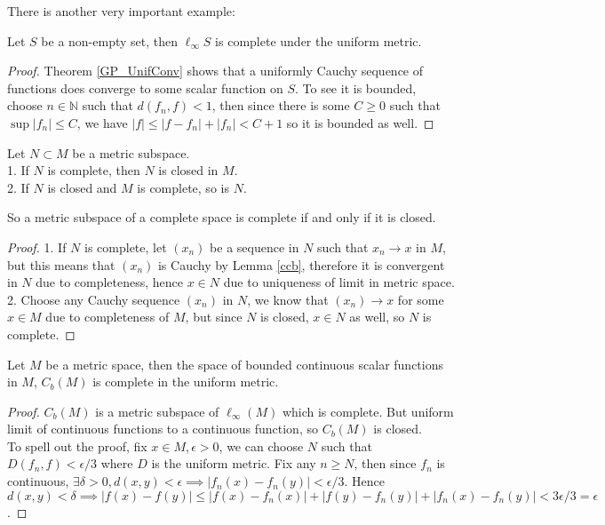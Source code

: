 There is another very important example:
\begin{theorem}
    Let $S$ be a non-empty set, then $\ell_\infty S$ is complete under the uniform metric.
\end{theorem}
\begin{proof}
    Theorem \ref{GP_UnifConv} shows that a uniformly Cauchy sequence of functions does converge to some scalar function on $S$.
    To see it is bounded, choose $n\in\mathbb N$ such that $d(f_n,f)<1$, then since there is some $C\ge 0$ such that $\sup|f_n|\le C$, we have $|f|\le |f-f_n|+|f_n|<C+1$ so it is bounded as well.
\end{proof}
\begin{proposition}
    Let $N\subset M$ be a metric subspace.\\
    1. If $N$ is complete, then $N$ is closed in $M$.\\
    2. If $N$ is closed and $M$ is complete, so is $N$.
\end{proposition}
So a metric subspace of a complete space is complete if and only if it is closed.
\begin{proof}
    1. If $N$ is complete, let $(x_n)$ be a sequence in $N$ such that $x_n\to x$ in $M$, but this means that $(x_n)$ is Cauchy by Lemma \ref{ccb}, therefore it is convergent in $N$ due to completeness, hence $x\in N$ due to uniqueness of limit in metric space.\\
    2. Choose any Cauchy sequence $(x_n)$ in $N$, we know that $(x_n)\to x$ for some $x\in M$ due to completeness of $M$, but since $N$ is closed, $x\in N$ as well, so $N$ is complete.
\end{proof}
\begin{theorem}
    Let $M$ be a metric space, then the space of bounded continuous scalar functions in $M$, $C_b(M)$ is complete in the uniform metric.
\end{theorem}
\begin{proof}
    $C_b(M)$ is a metric subspace of $\ell_\infty(M)$ which is complete.
    But uniform limit of continuous functions to a continuous function, so $C_b(M)$ is closed.\\
    To spell out the proof, fix $x\in M, \epsilon>0$, we can choose $N$ such that $D(f_n,f)<\epsilon/3$ where $D$ is the uniform metric.
    Fix any $n\ge N$, then since $f_n$ is continuous, $\exists \delta>0,d(x,y)<\epsilon\implies |f_n(x)-f_n(y)|<\epsilon/3$.
    Hence $d(x,y)<\delta\implies |f(x)-f(y)|\le |f(x)-f_n(x)|+|f(y)-f_n(y)|+|f_n(x)-f_n(y)|<3\epsilon/3=\epsilon$.
\end{proof}
